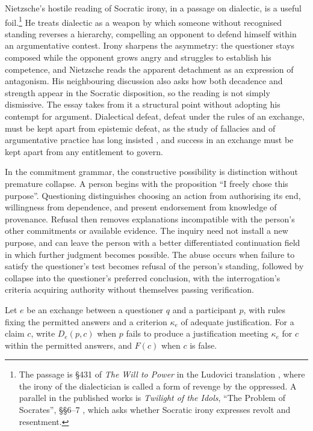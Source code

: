 \documentclass[11pt]{article}
\theoremstyle{definition}
\theoremstyle{remark}
\begin{document}
Nietzsche's hostile reading of Socratic irony, in a passage on dialectic, is a useful foil.\footnote{The passage is \S431 of \emph{The Will to Power} in the Ludovici translation \cite{nietzscheWTP}, where the irony of the dialectician is called a form of revenge by the oppressed. A parallel in the published works is \emph{Twilight of the Idols}, ``The Problem of Socrates'', \S\S6--7 \cite{nietzscheTI}, which asks whether Socratic irony expresses revolt and resentment.} He treats dialectic as a weapon by which someone without recognised standing reverses a hierarchy, compelling an opponent to defend himself within an argumentative contest. Irony sharpens the asymmetry: the questioner stays composed while the opponent grows angry and struggles to establish his competence, and Nietzsche reads the apparent detachment as an expression of antagonism. His neighbouring discussion also asks how both decadence and strength appear in the Socratic disposition, so the reading is not simply dismissive. The essay takes from it a structural point without adopting his contempt for argument. Dialectical defeat, defeat under the rules of an exchange, must be kept apart from epistemic defeat, as the study of fallacies and of argumentative practice has long insisted \cite{hamblin1970}, and success in an exchange must be kept apart from any entitlement to govern.

In the commitment grammar, the constructive possibility is distinction without premature collapse. A person begins with the proposition ``I freely chose this purpose''. Questioning distinguishes choosing an action from authorising its end, willingness from dependence, and present endorsement from knowledge of provenance. Refusal then removes explanations incompatible with the person's other commitments or available evidence. The inquiry need not install a new purpose, and can leave the person with a better differentiated continuation field in which further judgment becomes possible. The abuse occurs when failure to satisfy the questioner's test becomes refusal of the person's standing, followed by collapse into the questioner's preferred conclusion, with the interrogation's criteria acquiring authority without themselves passing verification.

Let $e$ be an exchange between a questioner $q$ and a participant $p$, with rules fixing the permitted answers and a criterion $\kappa_e$ of adequate justification. For a claim $c$, write $D_e(p,c)$ when $p$ fails to produce a justification meeting $\kappa_e$ for $c$ within the permitted answers, and $F(c)$ when $c$ is false.
\end{document}
